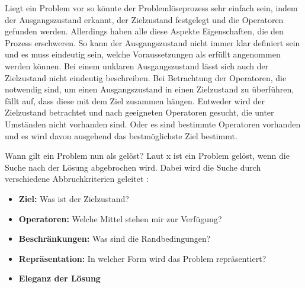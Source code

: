 Liegt ein Problem vor so könnte der Problemlöseprozess sehr einfach sein, indem der Ausgangszustand erkannt, der Zielzustand festgelegt und die Operatoren gefunden werden. Allerdings haben alle diese Aspekte Eigenschaften, die den Prozess erschweren. So kann der Ausgangszustand nicht immer klar definiert sein und es muss eindeutig sein, welche Voraussetzungen als erfüllt angenommen werden können. Bei einem unklaren Ausgangszustand lässt sich auch der Zielzustand nicht eindeutig beschreiben. Bei Betrachtung der Operatoren, die notwendig sind, um einen Ausgangszustand in einen Zielzustand zu überführen, fällt auf, dass diese mit dem Ziel zusammen hängen. Entweder wird der Zielzustand betrachtet und nach geeigneten Operatoren gesucht, die unter Umständen nicht vorhanden sind. Oder es sind bestimmte Operatoren vorhanden und es wird davon ausgehend das bestmöglichste Ziel bestimmt. \cite{Funke2015}

Wann gilt ein Problem nun als gelöst? Laut x ist ein Problem gelöst, wenn die Suche nach der Lösung abgebrochen wird. Dabei wird die Suche durch verschiedene Abbruchkriterien geleitet \cite{Funke2015}:
\begin{itemize}
\item \textbf{Ziel:} Was ist der Zielzustand?
\item \textbf{Operatoren:} Welche Mittel stehen mir zur Verfügung?
\item \textbf{Beschränkungen:} Was sind die Randbedingungen?
\item \textbf{Repräsentation:} In welcher Form wird das Problem repräsentiert?
\item \textbf{Eleganz der Lösung} 
\end{itemize}

